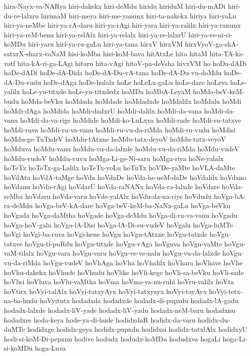 {hira-Nayx-va-NARya
hiri-dakekx
hiri-deMdu
hiridu
hiriduM
hiri-du-mADi
hiri-du-re-lalxru
hirimaM
hiri-meya
hiri-me-yanunx
hiri-ta-nakekx
hiriya
hiri-yaLu
hiri-ya-neMbe
hiri-ya-rA-daru
hiri-ya-rAgi
hiri-yara
hiri-ya-ralilx
hiri-ya-ranunx
hiri-ya-reM-benu
hiri-ya-relAlx
hiri-ya-relalx
hiri-ya-re-lalxrU
hiri-ya-re-ni-si-koMDu
hiri-yaru
hiri-ya-ru-gaLu
hiri-ya-tana
hirxV
hirxVM
hirxVyoV-ga-shA-satxrX-sharx-vaNaM
hisi-koMba
hisi-koM-bava
hitAtxLe
hita
hitaM
hita-TA-ka-vatf
hita-kA-ri-ga-LAgi
hitaru
hita-vAgi
hitoV-pa-deVsha
hivxVM
ho
hoDa-dADi
hoDe-dADi
hoDe-dA-Dida
hoDe-dA-Du-vA-tana
hoDe-dA-Du-vu-doMdu
hoDe-dA-Du-vudu
hoDe-dAga
hoDe-hulalx
hoLe
hoLeLx-gaLu
hoLe-dare
hoLeva
hoLe-yalilx
hoLe-yu-titxde
hoLe-yu-titxdedx
hoMDa
hoMbA-LeyaM
hoMda-beV-keM-budu
hoMda-beVku
hoMdada
hoMdade
hoMdadxde
hoMdalilx
hoMdalu
hoMdi
hoMdi-dAga
hoMdida
hoMdi-dadxrU
hoMdi-dalilx
hoMdi-da-vana
hoMdi-da-vanu
hoMdi-da-va-rige
hoMdide
hoMdi-ko-LuLxva
hoMdi-rade
hoMdi-ru-tatxve
hoMdi-ruva
hoMdi-ru-va-vanu
hoMdi-ru-vu-da-riMda
hoMdi-ru-vudu
hoMdisi
hoMdu-ge-TuTxdeV
hoMdu-tAtxne
hoMdu-tatx-deyoV
hoMdu-tatx-veyoV
hoMduva
hoMdu-vanu
hoMdu-vu-da-lalxde
hoMdu-vu-da-riMda
hoMdu-vudeV
hoMdu-vudoV
hoMdu-vuvu
hoMga-Li-ge-Ni-saru
hoMga-riya
hoNe-yalalx
hoTeTx
hoTeTx-ga-Lalilx
hoTeTx-yoLu
hoTuTx
hoVDe-yaMte
hoVLA-daMte
hoVdAta
hoVdA-taMge
hoVda
hoVdaDe
hoVda-he-neM-daDe
hoVdalilx
hoVdano
hoVdanu
hoVda-rAgi
hoVdarU
hoVda-raNANx
hoVda-ra-lalxde
hoVdare
hoVda-reMba
hoVdaru
hoVda-varu
hoVde-yalAlx
hoVdu-da-na-riye
hoVdudu
hoVga-bA-ra-deMdu
hoVga-beV-kA-dare
hoVga-beV-keM-ba-NaNx-gaLu
hoVga-beVku
hoVgada
hoVga-daMtha
hoVgade
hoVga-deMdu
hoVga-di-ru-va-vanu
hoVgadu
hoVga-hoV-galu
hoVga-lA-Disi
hoVga-lA-Di-su-vudeV
hoVgalu
hoVga-luMTe
hoVgi
hoVgi-ba-ruva
hoVgi-hene
hoVgu
hoVgu-tAtxne
hoVgu-tatxde
hoVgu-tatxve
hoVgu-ti-puRdu
hoVgu-titxde
hoVgu-vAga
hoVguva
hoVgu-vaMte
hoVgu-vaM-tilalx
hoVgu-vara
hoVgu-varu
hoVgu-ve-ve-nalu
hoVgu-vu-da-lalxde
hoVgu-vu-da-riMda
hoVgu-vudeV
hoVhAga
hoVha
hoVhalilx
hoVhara
hoVhave
hoVhe
hoVhu-dakekx
hoVhude
hoVhudu
hoVlike
hoVli-kege
hoVli-sa-beVku
hoVli-sade
hoVlisi
hoVluva
hoVlu-vaMtha
hoVma
hoVma-va-nu-ruhi
hoVru-valilx
hoVta
hoVtirx
hoVyi-talAlx
hoVyi-tatxyAyx
hoVyi-tatxyayx
hoVyi-tayAyx
hoVyi-tetx-na-ba-hudu
hoVyitutx
hodadxda
hodadxde
hodadx-di-pupxdu
hodadx-lA-gadu
hodadx-lalxde
hodadx-liV-yade
hodadx-liV-yadu
hodadx-neM-baru
hodadxnu
hodadxre
hoda-keya
hode-ya-di-hude
hodidxdaR
hodidx-da-varu
hodidx-du-duMTe
hodidxge
hodidx-geya
hodidx-pupxdu
hodidxsi
hodidx-tatxlAlx
hodidxyU
hodi-si-koM-Di-pepxnu
hodive
hodudx
hodudx-koMDu
hodudxva
hogaLi
hoga-Li-si-koMDu
hoga-Luva
}
